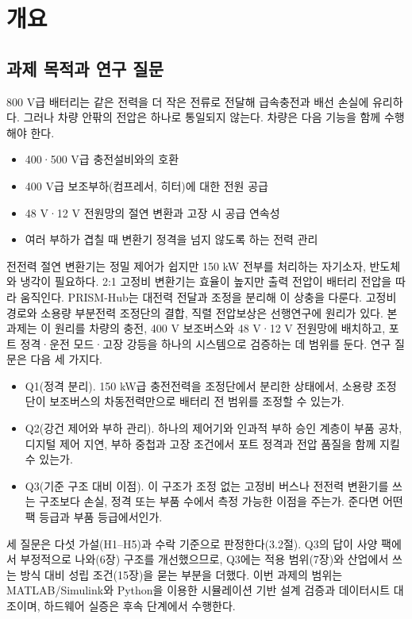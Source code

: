 \chapter{개요}

\section{과제 목적과 연구 질문}

800 V급 배터리는 같은 전력을 더 작은 전류로 전달해 급속충전과 배선 손실에 유리하다\cite{b1}. 그러나 차량 안팎의 전압은 하나로 통일되지 않는다. 차량은 다음 기능을 함께 수행해야 한다.

\begin{itemize}
\item 400·500 V급 충전설비와의 호환
\item 400 V급 보조부하(컴프레서, 히터)에 대한 전원 공급
\item 48 V·12 V 전원망의 절연 변환과 고장 시 공급 연속성
\item 여러 부하가 겹칠 때 변환기 정격을 넘지 않도록 하는 전력 관리
\end{itemize}

전전력 절연 변환기는 정밀 제어가 쉽지만 150 kW 전부를 처리하는 자기소자, 반도체와 냉각이 필요하다\cite{b2}. 2:1 고정비 변환기는 효율이 높지만\cite{b3} 출력 전압이 배터리 전압을 따라 움직인다. PRISM-Hub는 대전력 전달과 조정을 분리해 이 상충을 다룬다. 고정비 경로와 소용량 부분전력 조정단의 결합, 직렬 전압보상은 선행연구에 원리가 있다\cite{b4,b5,b6}. 본 과제는 이 원리를 차량의 충전, 400 V 보조버스와 48 V·12 V 전원망에 배치하고, 포트 정격·운전 모드·고장 강등을 하나의 시스템으로 검증하는 데 범위를 둔다. 연구 질문은 다음 세 가지다.

\begin{itemize}
\item Q1(정격 분리). 150 kW급 충전전력을 조정단에서 분리한 상태에서, 소용량 조정단이 보조버스의 차동전력만으로 배터리 전 범위를 조정할 수 있는가.
\item Q2(강건 제어와 부하 관리). 하나의 제어기와 인과적 부하 승인 계층이 부품 공차, 디지털 제어 지연, 부하 중첩과 고장 조건에서 포트 정격과 전압 품질을 함께 지킬 수 있는가.
\item Q3(기준 구조 대비 이점). 이 구조가 조정 없는 고정비 버스나 전전력 변환기를 쓰는 구조보다 손실, 정격 또는 부품 수에서 측정 가능한 이점을 주는가. 준다면 어떤 팩 등급과 부품 등급에서인가.
\end{itemize}

세 질문은 다섯 가설(H1–H5)과 수락 기준으로 판정한다(3.2절). Q3의 답이 사양 팩에서 부정적으로 나와(6장) 구조를 개선했으므로, Q3에는 적용 범위(7장)와 산업에서 쓰는 방식 대비 성립 조건(15장)을 묻는 부분을 더했다. 이번 과제의 범위는 MATLAB/Simulink와 Python을 이용한 시뮬레이션 기반 설계 검증과 데이터시트 대조이며, 하드웨어 실증은 후속 단계에서 수행한다.

